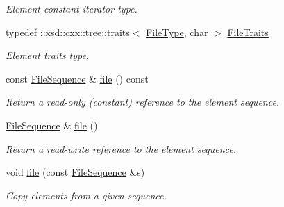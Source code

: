\begin{DoxyCompactItemize}
\begin{DoxyCompactList}\small\item\em Element constant iterator type. \item\end{DoxyCompactList}\item 
\hypertarget{classopenstack_1_1xml_1_1Personality_a1f35f94696c35fb435bf1ae556b686a8}{
typedef ::xsd::cxx::tree::traits$<$ \hyperlink{classopenstack_1_1xml_1_1File}{FileType}, char $>$ \hyperlink{classopenstack_1_1xml_1_1Personality_a1f35f94696c35fb435bf1ae556b686a8}{FileTraits}}
\label{classopenstack_1_1xml_1_1Personality_a1f35f94696c35fb435bf1ae556b686a8}

\begin{DoxyCompactList}\small\item\em Element traits type. \item\end{DoxyCompactList}\item 
const \hyperlink{classopenstack_1_1xml_1_1Personality_abbaf1d8ddffe77ba545048797e251b0b}{FileSequence} \& \hyperlink{classopenstack_1_1xml_1_1Personality_acd7a34b35b104bc7b0c4438e7b9a5a37}{file} () const 
\begin{DoxyCompactList}\small\item\em Return a read-\/only (constant) reference to the element sequence. \item\end{DoxyCompactList}\item 
\hyperlink{classopenstack_1_1xml_1_1Personality_abbaf1d8ddffe77ba545048797e251b0b}{FileSequence} \& \hyperlink{classopenstack_1_1xml_1_1Personality_ab0e381f879760f0a4beeddefdaa41e19}{file} ()
\begin{DoxyCompactList}\small\item\em Return a read-\/write reference to the element sequence. \item\end{DoxyCompactList}\item 
void \hyperlink{classopenstack_1_1xml_1_1Personality_a8d080d98882d2be2ef397f3c855ed9b2}{file} (const \hyperlink{classopenstack_1_1xml_1_1Personality_abbaf1d8ddffe77ba545048797e251b0b}{FileSequence} \&s)
\begin{DoxyCompactList}\small\item\em Copy elements from a given sequence. \item\end{DoxyCompactList}\end{DoxyCompactItemize}

